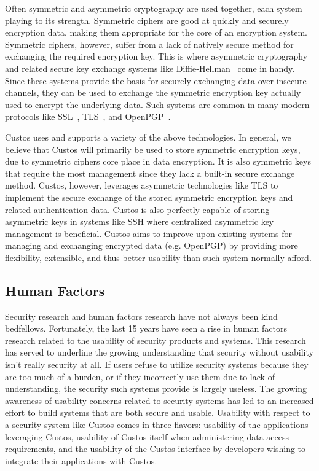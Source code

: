 Often symmetric and asymmetric cryptography are used together, each
system playing to its strength. Symmetric ciphers are good at quickly
and securely encryption data, making them appropriate for the core of
an encryption system. Symmetric ciphers, however, suffer from a lack
of natively secure method for exchanging the required encryption
key. This is where asymmetric cryptography and related secure key
exchange systems like Diffie-Hellman~\cite{Diffie1976} come in
handy. Since these systems provide the basis for securely exchanging
data over insecure channels, they can be used to exchange the
symmetric encryption key actually used to encrypt the underlying
data. Such systems are common in many modern protocols like
SSL~\cite{Freier2011}, TLS~\cite{Dierks2008}, and
OpenPGP~\cite{Callas2007, openpgp}.

Custos uses and supports a variety of the above technologies. In
general, we believe that Custos will primarily be used to store
symmetric encryption keys, due to symmetric ciphers core place in data
encryption. It is also symmetric keys that require the most management
since they lack a built-in secure exchange method. Custos, however,
leverages asymmetric technologies like TLS to implement the secure
exchange of the stored symmetric encryption keys and related
authentication data. Custos is also perfectly capable of storing
asymmetric keys in systems like SSH where centralized asymmetric key
management is beneficial. Custos aims to improve upon existing systems
for managing and exchanging encrypted data (e.g. OpenPGP) by providing
more flexibility, extensible, and thus better usability than such
system normally afford.

\subsection{Human Factors}

Security research and human factors research have not always been kind
bedfellows. Fortunately, the last 15 years have seen a rise in human
factors research related to the usability of security products and
systems. This research has served to underline the growing
understanding that security without usability isn't really security at
all. If users refuse to utilize security systems because they are too
much of a burden, or if they incorrectly use them due to lack of
understanding, the security such systems provide is largely
useless. The growing awareness of usability concerns related to
security systems has led to an increased effort to build systems that
are both secure and usable. Usability with respect to a security
system like Custos comes in three flavors: usability of the
applications leveraging Custos, usability of Custos itself when
administering data access requirements, and the usability of the
Custos interface by developers wishing to integrate their applications
with Custos.

